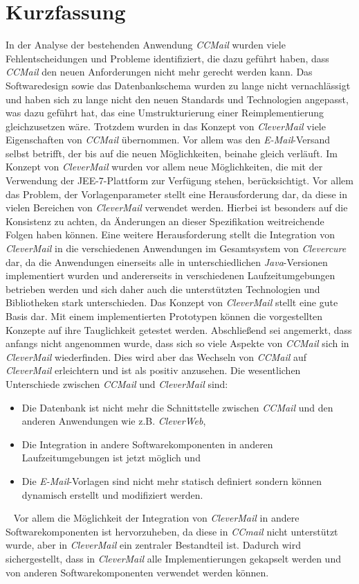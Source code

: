 \chapter{Kurzfassung}
In der Analyse der bestehenden Anwendung \emph{CCMail} wurden viele Fehlentscheidungen und Probleme identifiziert, die dazu geführt haben, dass \emph{CCMail} den neuen Anforderungen nicht mehr gerecht werden kann. Das Softwaredesign sowie das Datenbankschema wurden zu lange nicht vernachlässigt und haben sich zu lange nicht den neuen Standards und Technologien angepasst, was dazu geführt hat, das eine Umstrukturierung einer Reimplementierung gleichzusetzen wäre. Trotzdem wurden in das Konzept von \emph{CleverMail} viele Eigenschaften von \emph{CCMail} übernommen. Vor allem was den \emph{E-Mail}-Versand selbst betrifft, der bis auf die neuen Möglichkeiten, beinahe gleich verläuft. Im Konzept von \emph{CleverMail} wurden vor allem neue Möglichkeiten, die mit der Verwendung der JEE-7-Plattform zur Verfügung stehen, berücksichtigt. Vor allem das Problem, der Vorlagenparameter stellt eine Herausforderung dar, da diese in vielen Bereichen von \emph{CleverMail} verwendet werden. Hierbei ist besonders auf die Konsistenz zu achten, da Änderungen an dieser Spezifikation weitreichende Folgen haben können. 
\newline
\newline
Eine weitere Herausforderung stellt die Integration von \emph{CleverMail} in die verschiedenen Anwendungen im Gesamtsystem von \emph{Clevercure} dar, da die Anwendungen einerseits alle in unterschiedlichen \emph{Java}-Versionen implementiert wurden und andererseits in verschiedenen Laufzeitumgebungen betrieben werden und sich daher auch die unterstützten Technologien und Bibliotheken stark unterschieden. Das Konzept von \emph{CleverMail} stellt eine gute Basis dar. Mit einem implementierten Prototypen können die vorgestellten Konzepte auf ihre Tauglichkeit getestet werden. Abschließend sei angemerkt, dass anfangs nicht angenommen wurde, dass sich so viele Aspekte von \emph{CCMail} sich in \emph{CleverMail} wiederfinden. Dies wird aber das Wechseln von \emph{CCMail} auf \emph{CleverMail} erleichtern und ist als positiv anzusehen. Die wesentlichen Unterschiede zwischen \emph{CCMail} und \emph{CleverMail} sind:
\begin{itemize}
	\item Die Datenbank ist nicht mehr die Schnittstelle zwischen \emph{CCMail} und den anderen Anwendungen wie z.B. \emph{CleverWeb},
	\item Die Integration in andere Softwarekomponenten in anderen Laufzeitumgebungen ist jetzt möglich und
	\item Die \emph{E-Mail}-Vorlagen sind nicht mehr statisch definiert sondern können dynamisch erstellt und modifiziert werden.
\end{itemize}
\ \newline
Vor allem die Möglichkeit der Integration von \emph{CleverMail} in andere Softwarekomponenten ist hervorzuheben, da diese in \emph{CCmail} nicht unterstützt wurde, aber in \emph{CleverMail} ein zentraler Bestandteil ist. Dadurch wird sichergestellt, dass in \emph{CleverMail} alle Implementierungen gekapselt werden und von anderen Softwarekomponenten verwendet werden können.